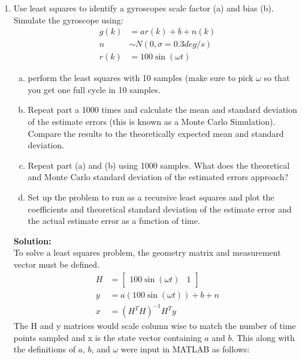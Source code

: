 \documentclass[11pt]{article}
\newcommand{\solution}{\textbf{Solution: \\}}
\begin{document}
\begin{enumerate}[label=\textbf{\arabic*.}]
  \newpage
  \item Use least squares to identify a gyroscopes scale factor (a) and bias (b).  Simulate the
  gyroscope using:
  \begin{equation*}
    \begin{split}
      g(k) &= ar(k) + b + n(k) \\
      n &\sim N(0, \sigma=0.3 \si{deg/s}) \\
      r(k) &= 100\sin(\omega t)
    \end{split}
  \end{equation*}
  \begin{enumerate}[(a)]
    \itemsep -2pt
    \item perform the least squares with 10 samples (make sure to pick 
    $\omega$ so that you get one full cycle in 10 samples.
    \item Repeat part a 1000 times and calculate the mean and standard 
    deviation of the estimate errors (this is known as a Monte Carlo Simulation). 
    Compare the results to the theoretically expected mean and standard 
    deviation.
    \item Repeat part (a) and (b) using 1000 samples.  What does the theoretical 
    and Monte Carlo standard deviation of the estimated errors approach?
    \item Set up the problem to run as a recursive least squares and plot 
    the coefficients and theoretical standard deviation of the estimate error 
    and the actual estimate error as a function of time.
  \end{enumerate}
  \solution
  To solve a least squares problem, the geometry matrix and measurement vector 
  must be defined.
  \begin{equation*}
    \begin{split}
      H &= 
      \begin{bmatrix}
        100\sin(\omega t) & 1
      \end{bmatrix} \\
      y &= a(100\sin(\omega t)) + b + n \\
      x &= (H^TH)^{-1}H^Ty
    \end{split}
  \end{equation*}
  The H and y matrices would scale column wise to match the number of time 
  points sampled and x is the state vector containing $a$ and $b$. This along 
  with the definitions of $a$, $b$, and $\omega$ were input in MATLAB as 
  follows:
  \begin{lstlisting}

\end{lstlisting}
\end{enumerate}
\end{document}
